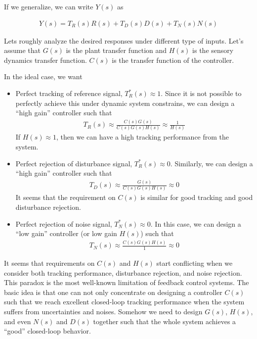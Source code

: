 \documentclass[twoside]{article}
\begin{document}
  If we generalize, we can write $Y(s)$ as 
  
  \begin{align*}
  Y(s) = T_R(s) R(s) + T_D(s) D(s) + T_N(s) N(s)
  \end{align*}
  
  Lets roughly analyze the desired responses under different type of inputs. 
  Let's assume that $G(s)$ is the plant transfer function and $H(s)$ is the sensory 
  dynamics transfer function. $C(s)$ is the 
  transfer function of the controller.
  
  In the ideal case, we want 
  \begin{itemize}
  	\item Perfect tracking of reference signal, $T^*_R(s) \approx 1 $. 
	Since it is not possible to perfectly achieve this under dynamic system constrains,
	we can design a ``high gain'' controller such that 
	  \begin{align*}
	  	T_R(s) \approx \frac{C(s) G(s)}{C(s) G(s) H(s)} \approx \frac{1}{H(s)}
	  \end{align*}
	  If $H(s) \approx 1$, then we can have a high tracking performance from the system. 
	  \item Perfect rejection of disturbance signal, $T^*_R(s) \approx 0 $. Similarly, 
	  we can design a ``high gain'' controller such that 
	  \begin{align*}
	  	T_D(s) \approx \frac{G(s)}{C(s) G(s) H(s)} \approx 0
	  \end{align*}
	  It seems that the requirement on $C(s)$ is similar for good tracking and
	  good disturbance rejection. 
	  \item Perfect rejection of noise signal, $T^*_N(s) \approx 0 $. In this case, we can design a 
	  ``low gain'' controller (or low gain $H(s)$) such that 
	  	  \begin{align*}
	  	T_N(s) \approx \frac{C(s) G(s) H(s)}{1} \approx 0
	  \end{align*}
  \end{itemize}
  
It seems that requirements on $C(s)$ and $H(s)$ start conflicting when we consider both tracking performance, disturbance rejection, and noise rejection. This paradox is the most well-known limitation of feedback control systems. The basic idea is that one can not only concentrate on designing a controller $C(s)$ such that we reach excellent closed-loop tracking performance when the system suffers from uncertainties and noises. Somehow we need to design $G(s)$, $H(s)$, and even $N(s)$ and $D(s)$ together such that the whole system achieves a ``good'' closed-loop behavior. 
  
  
\end{document}
